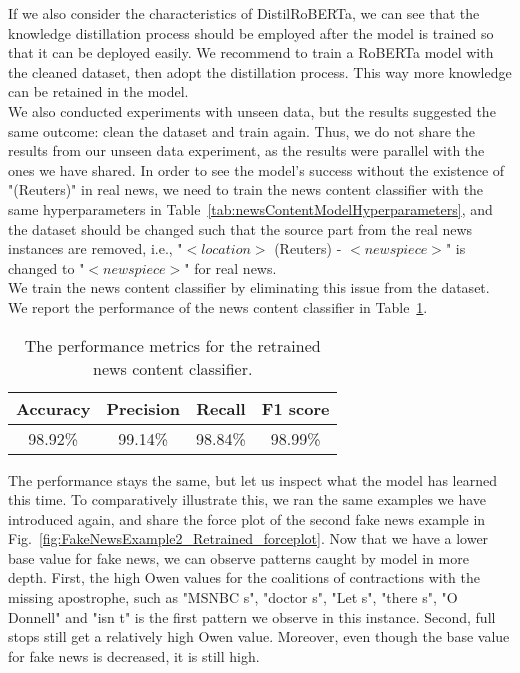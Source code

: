 If we also consider the characteristics of DistilRoBERTa, we can see that the knowledge distillation process should be employed after the model is trained so that it can be deployed easily. We recommend to train a RoBERTa model with the cleaned dataset, then adopt the distillation process. This way more knowledge can be retained in the model.\\
We also conducted experiments with unseen data, but the results suggested the same outcome: clean the dataset and train again. Thus, we do not share the results from our unseen data experiment, as the results were parallel with the ones we have shared. In order to see the model's success without the existence of "(Reuters)" in real news, we need to train the news content classifier with the same hyperparameters in Table~\ref{tab:newsContentModelHyperparameters}, and the dataset should be changed such that the source part from the real news instances are removed, i.e., "$<location>$ (Reuters) -  $<newspiece>$" is changed to "$<newspiece>$" for real news.\\
We train the news content classifier by eliminating this issue from the dataset. We report the performance of the news content classifier in Table~\ref{tab:newsContentModelRetrainedPerformanceMetrics}.
\begin{table}
    \centering
    \begin{tabular}{c | c | c | c}
        \textbf{Accuracy} & \textbf{Precision} & \textbf{Recall} & \textbf{F1 score} \\
        \hline
        98.92\%           & 99.14\%            & 98.84\%         & 98.99\%           \\
    \end{tabular}
    \caption[The performance metrics for the retrained news content classifier.]{The performance metrics for the retrained news content classifier.}
    \label{tab:newsContentModelRetrainedPerformanceMetrics}
\end{table}
The performance stays the same, but let us inspect what the model has learned this time. To comparatively illustrate this, we ran the same examples we have introduced again, and share the force plot of the second fake news example in Fig.~\ref{fig:FakeNewsExample2_Retrained_forceplot}. Now that we have a lower base value for fake news, we can observe patterns caught by model in more depth. First, the high Owen values for the coalitions of contractions with the missing apostrophe, such as "MSNBC s", "doctor s", "Let s", "there s", "O Donnell" and "isn t" is the first pattern we observe in this instance. Second, full stops still get a relatively high Owen value. Moreover, even though the base value for fake news is decreased, it is still high.
